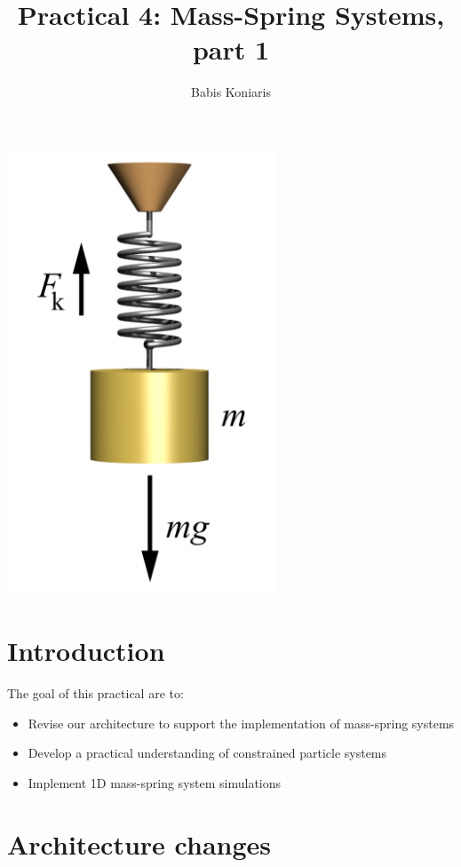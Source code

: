 \documentclass[12pt]{article}
\title{\textbf{Practical 4: Mass-Spring Systems, part 1 }}
\author{Babis Koniaris}
\date{}
\begin{document}
\maketitle

\begin{center}
\includegraphics[width=0.6\textwidth]{p4-teaser.png}
\end{center}
\pagebreak

\section*{Introduction}

The goal of this practical are to:

\begin{itemize}
\item Revise our architecture to support the implementation of mass-spring systems
\item Develop a practical understanding of constrained particle systems
\item Implement 1D mass-spring system simulations
\end{itemize}

\section*{Architecture changes}
\end{document}
